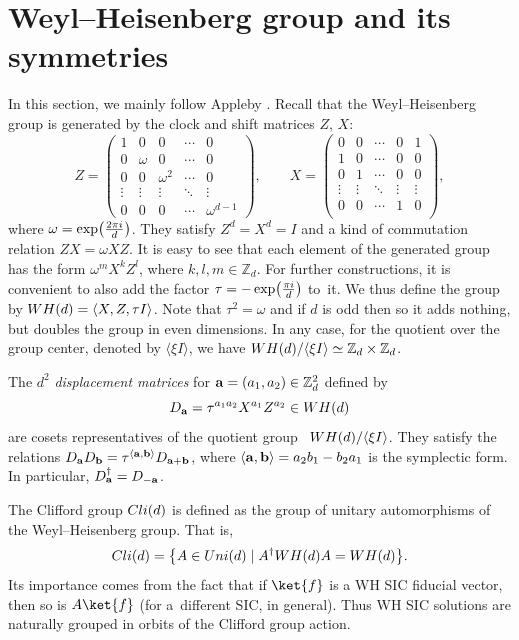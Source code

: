 \documentclass[11pt]{article}
\numberwithin{equation}{section}
\numberwithin{equation}{section}
\newcommand{\la}{\langle}
\newcommand{\ra}{\rangle}
\newcommand{\mbb}{\mathbb}
\newcommand{\bmp}{\begin{pmatrix}}
\newcommand{\emp}{\end{pmatrix}}
\begin{document}
\section{Weyl--Heisenberg group and its symmetries}\label{sec:wh}

In this section, we mainly follow Appleby \cite{Appleby}.
Recall that the Weyl--Heisenberg group is generated by
the clock and shift matrices $Z$, $X$:
\[
Z = \bmp
1 & 0 & 0 & \cdots & 0\\
0 & \omega & 0 & \cdots & 0\\
0 & 0 & \omega^2 & \cdots & 0\\
\vdots & \vdots & \vdots & \ddots & \vdots\\
0 & 0 & 0 & \cdots & \omega^{d-1}
\emp,
\qquad
X = \bmp
0 & 0 & \cdots & 0 & 1\\
1 & 0 & \cdots & 0 & 0\\
0 & 1 & \cdots & 0 & 0\\
\vdots & \vdots & \ddots &\vdots &\vdots\\
0 & 0 & \cdots & 1 & 0\\
\emp,
\]
where $\omega = \exp \bigl(\frac{2\pi{\rm i}}{d}\bigr)$.
They satisfy $Z^d = X^d = I$ and a kind of commutation relation $ZX = \omega XZ$.
It is easy to see that each element of the generated group has the
form $\omega^mX^kZ^l$, where $k,l,m \in \mbb{Z}_d$.
For further constructions, it is convenient to also add the factor $\tau = -\exp \bigl(\frac{\pi {\rm i}}{d}\bigr)$ to~it.
We thus define the group by ${\rm WH}(d) = \la X, Z, \tau I \ra$.
Note that $\tau^2 = \omega$ and if $d$ is odd then 
so it adds nothing, but doubles the group in even dimensions.
In any case, for the quotient over the group center, denoted by $\la \xi I \ra$, we have ${\rm WH}(d) / \la \xi I \ra \simeq \mbb{Z}_d \times \mbb{Z}_d$.

The $d^2$ \textit{displacement matrices} for ${\bf a} = (a_1,a_2) \in \mbb{Z}_d^2$ defined by
\[
D_{\bf a} = \tau^{a_1a_2} X^{a_1}Z^{a_2} \in {\rm WH}(d)
\]
are cosets representatives of the quotient group ~${{\rm WH}(d) / \la \xi I \ra}$.
They satisfy the relations $D_{\bf a} D_{\bf b} = \tau^{\la \bf a, b\ra} D_{\bf a+b}$,
where $\la {\bf a, b} \ra = a_2b_1 - b_2a_1$ is the symplectic form.
In particular, $D_{\bf a}^\dag = D_{-\bf a}$.

The Clifford group ${\rm Cli}(d)$ is defined as the group of unitary automorphisms
of the Weyl--Heisenberg group. That is,
\[
{\rm Cli}(d) = \bigl\{ A \in {\rm Uni}(d) \mid A^\dag {\rm WH}(d) A = {\rm WH}(d) \bigr\}.
\]
Its importance comes from the fact that if $\ket{f}$ is a WH SIC fiducial vector,
then so is $A\ket{f}$ (for a~different SIC, in general).
Thus WH SIC solutions are naturally grouped in orbits of the Clifford group action.
\end{document}
